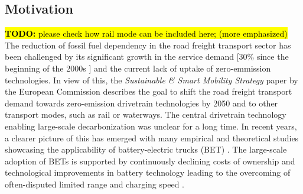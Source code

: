 \documentclass[preprint,10pt,review, authoryear]{elsarticle}
\begin{document}
    \subsection{Motivation}
        \hl{\textbf{TODO:} please check how rail mode can be included here; (more emphasized)}
        The reduction of fossil fuel dependency in the road freight transport sector has been challenged by its significant growth in the service demand [30\% since the beginning of the 2000s \citep{EEA_RoadTransport}] and the current lack of uptake of zero-emmission technologies. In view of this, the \textit{Sustainable \& Smart Mobility Strategy} paper by the European Commission \citep{EU_MobilityStrategy} describes the goal to shift the road freight transport demand towards zero-emission drivetrain technologies by 2050 and to other transport modes, such as rail or waterways. 
        The central drivetrain technology enabling large-scale decarbonization was unclear for a long time. In recent years, a clearer picture of this has emerged with many empirical and theoretical studies showcasing the applicability of battery-electric trucks (BET) \citep{Plötz2022}. The large-scale adoption of BETs is supported by continuously declining costs of ownership \citep{MAGNINO2024113215, NOLL2022118079} and technological improvements in battery technology leading to the overcoming of often-disputed limited range and charging speed \citep{AGUILAR2022102624}. 
       
\end{document}
